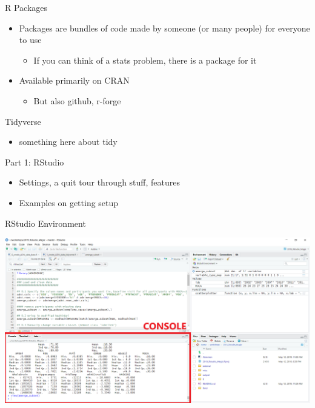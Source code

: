 \documentclass[
  ignorenonframetext,
]{beamer}
\providecommand{\tightlist}{%
  \setlength{\itemsep}{0pt}\setlength{\parskip}{0pt}}
\begin{document}
\begin{frame}{R Packages}
\protect\hypertarget{r-packages}{}

\begin{itemize}[<+->]
\tightlist
\item
  Packages are bundles of code made by someone (or many people) for
  everyone to use

  \begin{itemize}[<+->]
  \tightlist
  \item
    If you can think of a stats problem, there is a package for it
  \end{itemize}
\item
  Available primarily on CRAN

  \begin{itemize}[<+->]
  \tightlist
  \item
    But also github, r-forge
  \end{itemize}
\end{itemize}

\end{frame}

\begin{frame}{Tidyverse}
\protect\hypertarget{tidyverse}{}

\begin{itemize}[<+->]
\tightlist
\item
  something here about tidy
\end{itemize}

\end{frame}

\begin{frame}{Part 1: RStudio}
\protect\hypertarget{part-1-rstudio}{}

\begin{itemize}[<+->]
\tightlist
\item
  Settings, a quit tour through stuff, features
\item
  Examples on getting setup
\end{itemize}

\end{frame}

\begin{frame}{RStudio Environment}
\protect\hypertarget{rstudio-environment}{}

\includegraphics{../external/images/rstudio_terminal_1_CONSOLE.png}

\end{frame}
\end{document}
